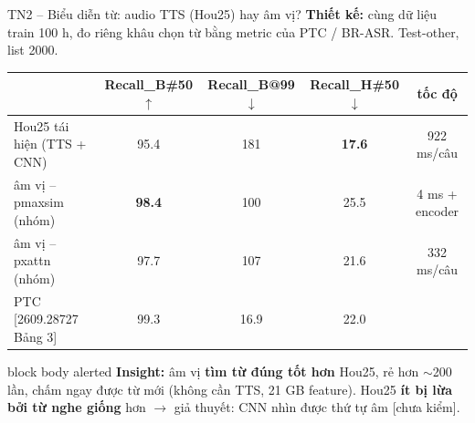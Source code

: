 \documentclass[aspectratio=169,xcolor=table]{beamer}
\newcommand{\good}[1]{\textcolor{GoodGreen}{\textbf{#1}}}
\newcommand{\src}[1]{{\tiny\color{TextGray}[#1]}}
\newcommand{\ra}{$\rightarrow$}
\begin{document}
\begin{frame}{TN2 -- Biểu diễn từ: audio TTS (Hou25) hay âm vị?}
\textbf{Thiết kế:} cùng dữ liệu train 100 h, đo riêng khâu chọn từ bằng metric của PTC / BR-ASR. Test-other, list 2000.\par\vspace{0.25cm}
\centering
\begin{tabular}{lcccc}
\toprule
 & Recall\_B\#50 $\uparrow$ & Recall\_B@99 $\downarrow$ & Recall\_H\#50 $\downarrow$ & tốc độ\\
\midrule
Hou25 tái hiện (TTS + CNN) & 95.4 & 181 & \good{17.6} & 922 ms/câu\\
âm vị -- pmaxsim (nhóm) & \good{98.4} & 100 & 25.5 & 4 ms + encoder\\
âm vị -- pxattn (nhóm) & 97.7 & 107 & 21.6 & 332 ms/câu\\
PTC \src{2609.28727 Bảng 3} & 99.3 & 16.9 & 22.0 & \\
\bottomrule
\end{tabular}\par
\vspace{0.1cm}{\scriptsize \#50: \% từ đúng trong top-50. @99: số từ/câu phải giữ để không sót quá 1\% từ đúng. H\#50: \% từ nghe giống từ đúng lọt top-50.}
\raggedright
\vspace{0.2cm}
\begin{beamercolorbox}[sep=0.5em,rounded=true]{block body alerted}
\textbf{Insight:} âm vị \textbf{tìm từ đúng tốt hơn} Hou25, rẻ hơn $\sim$200 lần, chấm ngay được từ mới (không cần TTS, 21 GB feature).
Hou25 \textbf{ít bị lừa bởi từ nghe giống} hơn \ra{} giả thuyết: CNN nhìn được thứ tự âm \src{chưa kiểm}.
\end{beamercolorbox}
\end{frame}
\end{document}
